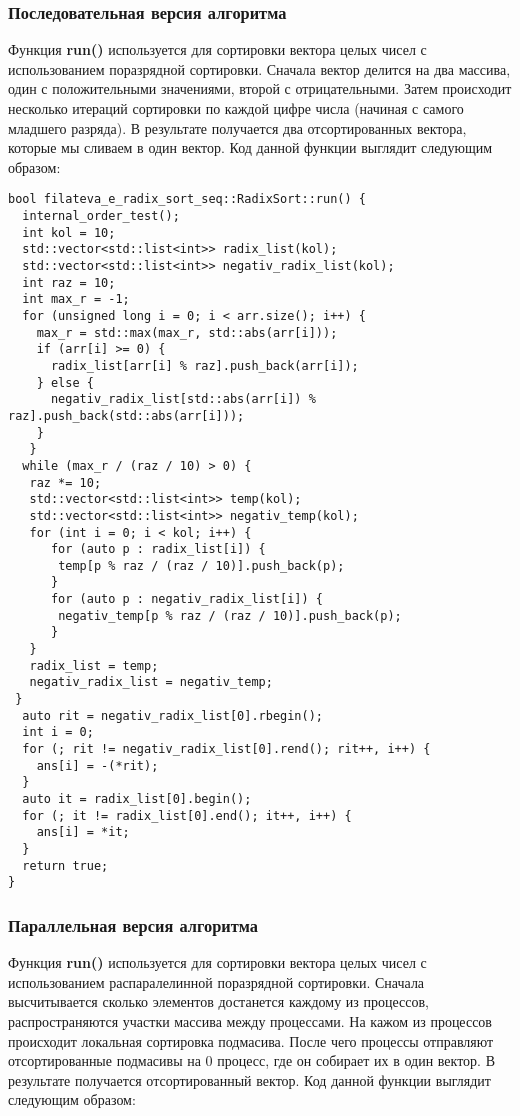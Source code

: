 \documentclass[a4paper, 14pt]{article}
\begin{document}
	\subsubsection*{\centering Последовательная версия алгоритма}
	Функция \textbf{run()} используется для сортировки вектора целых чисел с использованием поразрядной сортировки. Сначала вектор делится на два массива, один с положительными значениями, второй с отрицательными. Затем происходит несколько итераций сортировки по каждой цифре числа (начиная с самого младшего разряда). В результате получается два отсортированных вектора, которые мы сливаем в один вектор. Код данной функции выглядит следующим образом:
	\vspace{-1em}
	\begin{verbatim}
bool filateva_e_radix_sort_seq::RadixSort::run() {
  internal_order_test();
  int kol = 10;
  std::vector<std::list<int>> radix_list(kol);
  std::vector<std::list<int>> negativ_radix_list(kol);
  int raz = 10;
  int max_r = -1;
  for (unsigned long i = 0; i < arr.size(); i++) {
    max_r = std::max(max_r, std::abs(arr[i]));
    if (arr[i] >= 0) {
      radix_list[arr[i] % raz].push_back(arr[i]);
    } else {
      negativ_radix_list[std::abs(arr[i]) % raz].push_back(std::abs(arr[i]));
    }
   }
  while (max_r / (raz / 10) > 0) {
   raz *= 10;
   std::vector<std::list<int>> temp(kol);
   std::vector<std::list<int>> negativ_temp(kol);
   for (int i = 0; i < kol; i++) {
      for (auto p : radix_list[i]) {
       temp[p % raz / (raz / 10)].push_back(p);
      }
      for (auto p : negativ_radix_list[i]) {
       negativ_temp[p % raz / (raz / 10)].push_back(p);
      }
   }
   radix_list = temp;
   negativ_radix_list = negativ_temp;
 }
  auto rit = negativ_radix_list[0].rbegin();
  int i = 0;
  for (; rit != negativ_radix_list[0].rend(); rit++, i++) {
    ans[i] = -(*rit);
  }
  auto it = radix_list[0].begin();
  for (; it != radix_list[0].end(); it++, i++) {
    ans[i] = *it;
  }
  return true;
}
	\end{verbatim}	

	
	\subsubsection*{\centering Параллельная версия алгоритма}
	Функция \textbf{run()} используется для сортировки вектора целых чисел с использованием распаралелинной поразрядной сортировки. Сначала высчитывается сколько элементов достанется каждому из процессов, распространяются участки массива между процессами. На кажом из процессов происходит локальная сортировка подмасива. После чего процессы отправляют отсортированные подмасивы на 0 процесс, где он собирает их в один вектор. В результате получается отсортированный вектор. Код данной функции выглядит следующим образом:
\end{document}

